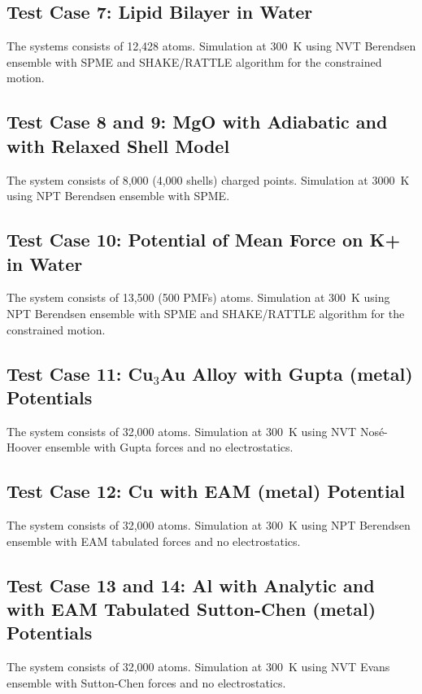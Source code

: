 \subsection{Test Case 7: Lipid Bilayer in Water}

The systems consists of 12,428 atoms.  Simulation at 300~K using NVT
Berendsen ensemble with SPME and SHAKE/RATTLE algorithm for the constrained motion.

\subsection{Test Case 8 and 9: MgO with Adiabatic and with Relaxed Shell Model}

The system consists of 8,000 (4,000 shells) charged points.  Simulation
at 3000~K using NPT Berendsen ensemble with SPME.

\subsection{Test Case 10: Potential of Mean Force on K+ in Water}

The system consists of 13,500 (500 PMFs) atoms.  Simulation at 300~K
using NPT Berendsen ensemble with SPME and SHAKE/RATTLE algorithm for
the constrained motion.

\subsection{Test Case 11: Cu$_{3}$Au Alloy with Gupta (metal) Potentials}

The system consists of 32,000 atoms.  Simulation at 300~K using NVT
Nos\'e-Hoover ensemble with Gupta forces and no electrostatics.

\subsection{Test Case 12: Cu with EAM (metal) Potential}

The system consists of 32,000 atoms.  Simulation at 300~K using NPT
Berendsen ensemble with EAM tabulated forces and no electrostatics.

\subsection{Test Case 13 and 14: Al with Analytic and with EAM Tabulated Sutton-Chen (metal) Potentials}

The system consists of 32,000 atoms.  Simulation at 300~K using NVT
Evans ensemble with Sutton-Chen forces and no electrostatics.

